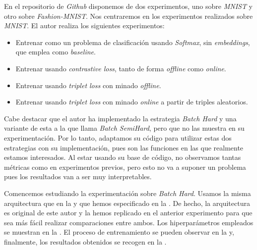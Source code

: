 En el repositorio de \textit{Github} \cite{informatica:adambielski_github} disponemos de dos experimentos, uno sobre \textit{MNIST} y otro sobre \textit{Fashion-MNIST}. Nos centraremos en los experimentos realizados sobre \textit{MNIST}. El autor realiza los siguientes experimentos:

\begin{itemize}
    \item Entrenar como un problema de clasificación usando \textit{Softmax}, sin \textit{embeddings}, que emplea como \textit{baseline}.
    \item Entrenar usando \textit{contrastive loss}, tanto de forma \textit{offline} como \textit{online}.
    \item Entrenar usando \textit{triplet loss} con minado \textit{offline}.
    \item Entrenar usando \textit{triplet loss} con minado \textit{online} a partir de triples aleatorios.
\end{itemize}

Cabe destacar que el autor ha implementado la estrategia \textit{Batch Hard} y una variante de esta a la que llama \textit{Batch SemiHard}, pero que no las muestra en su experimentación. Por lo tanto, adaptamos su código para utilizar estas dos estrategias con su implementación, pues son las funciones en las que realmente estamos interesados. Al estar usando su base de código, no observamos tantas métricas como en experimentos previos, pero esto no va a suponer un problema pues los resultados van a ser muy interpretables.

Comencemos estudiando la experimentación sobre \textit{Batch Hard}. Usamos la misma arquitectura que en la  y que hemos especificado en la . De hecho, la arquitectura es original de este autor y la hemos replicado en el anterior experimento para que sea más fácil realizar comparaciones entre ambos. Los hiperparámetros empleados se muestran en la . El proceso de entrenamiento se pueden observar en la  y, finalmente, los resultados obtenidos se recogen en la .

